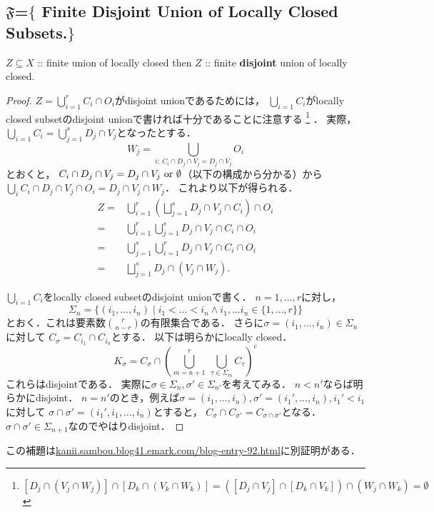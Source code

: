 \documentclass[a4paper]{jsarticle}
\begin{document}
    \subsection{$\mathfrak{F}$=$\{$ Finite Disjoint Union of Locally Closed Subsets.$\}$}
    \begin{Lemma}
        $Z \subseteq X$ :: finite union of locally closed
        then
        $Z$ :: finite \textbf{disjoint} union of locally closed.
    \end{Lemma}
    \begin{proof}
        $Z=\bigcup_{i=1}^r C_i \cap O_i$がdisjoint unionであるためには，
        $\bigcup_{i=1} C_i$がlocally closed subsetのdisjoint unionで書ければ十分であることに注意する
        \footnote
        {
        $[D_j \cap (V_j \cap W_j)] \cap [D_k \cap (V_k \cap W_k)]
            =([D_j \cap V_j] \cap [D_k \cap V_k]) \cap (W_j \cap W_k)=\emptyset$
        }
        ．
        実際，$\bigcup_{i=1} C_i=\bigcup_{j=1}^s D_j \cap V_j$となったとする．
        \[ W_j=\bigcup_{i;~ C_i \cap D_j \cap V_j=D_j \cap V_j} O_i \]
        とおくと，
        $C_i \cap D_j \cap V_j=D_j \cap V_j \text{ or } \emptyset$（以下の構成から分かる）から
        $\bigcup_i C_i \cap D_j \cap V_j \cap O_i=D_j \cap V_j \cap W_j$．
        これより以下が得られる．
        \begin{align*}
            Z 
            =&  \bigcup_{i=1}^r \left(\bigsqcup_{j=1}^s D_j \cap V_j \cap C_i \right) \cap O_i \\
            =&  \bigcup_{i=1}^r \bigcup_{j=1}^s D_j \cap V_j \cap C_i \cap O_i \\
            =&  \bigcup_{j=1}^s \bigcup_{i=1}^r D_j \cap V_j \cap C_i \cap O_i \\
            =&  \bigsqcup_{j=1}^s D_j \cap (V_j \cap W_j).
        \end{align*}

        $\bigcup_{i=1} C_i$をlocally closed subsetのdisjoint unionで書く．
        $n=1,\dots,r$に対し，
        \[ \Sigma_n=\{ (i_1,\dots,i_n) \mid i_1<\dots<i_n \land i_1,\dots i_n \in \{1,\dots,r\} \} \]
        とおく．これは要素数$\binom{r}{n-r}$の有限集合である．
        さらに$\sigma=(i_1,\dots,i_n) \in \Sigma_n$に対して
        $C_{\sigma}=C_{i_1} \cap C_{i_n}$とする．
        以下は明らかにlocally closed．
        \[ K_{\sigma}=C_{\sigma} \cap \left( \bigcup_{m=n+1}^r ~\bigcup_{\tau \in \Sigma_m} C_{\tau} \right)^c \]
        これらはdisjointである．
        実際に$\sigma \in \Sigma_{n}, \sigma' \in \Sigma_{n'}$を考えてみる．
        $n < n'$ならば明らかにdisjoint．
        $n=n'$のとき，例えば$\sigma=(i_1,\dots,i_n),\sigma'=(i_1',\dots,i_n), i_1'<i_1$に対して
        $\sigma \cap \sigma'=(i_1',i_1,\dots,i_n)$とすると，
        $C_{\sigma} \cap C_{\sigma'}=C_{\sigma \cap \sigma'}$となる．
        $\sigma \cap \sigma' \in \Sigma_{n+1}$なのでやはりdisjoint．
    \end{proof}
    この補題は\url{kanii.sambou.blog41.emark.com/blog-entry-92.html}に別証明がある．
\end{document}
